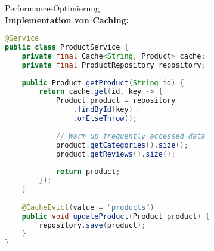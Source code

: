 \begin{example2}{Performance-Optimierung}\\
\textbf{Implementation von Caching:}

\begin{lstlisting}[language=Java, style=basesmol]
@Service
public class ProductService {
    private final Cache<String, Product> cache;
    private final ProductRepository repository;
    
    public Product getProduct(String id) {
        return cache.get(id, key -> {
            Product product = repository
                .findById(key)
                .orElseThrow();
                
            // Warm up frequently accessed data
            product.getCategories().size();
            product.getReviews().size();
            
            return product;
        });
    }
    
    @CacheEvict(value = "products")
    public void updateProduct(Product product) {
        repository.save(product);
    }
}
\end{lstlisting}
\end{example2}